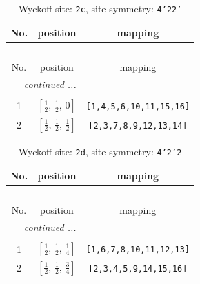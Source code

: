 \documentclass[fleqn,8pt]{jsarticle}
\begin{document}
\renewcommand{\arraystretch}{1.2}
\begin{longtable}{ccc}
\caption{Wyckoff site: {\tt 2c}, site symmetry: {\tt 4'22'}}
 \\
 \hline \hline
No. & position & mapping \\ \hline \endfirsthead

\multicolumn{2}{l}{\tablename\ \thetable{}} \\
 \hline \hline
No. & position & mapping \\ \hline \endhead

 \hline \hline
\multicolumn{2}{r}{\footnotesize\it continued ...} \\ \endfoot

 \hline \hline
\multicolumn{2}{r}{} \\ \endlastfoot

1 & $\left[ \frac{1}{2},\, \frac{1}{2},\, 0 \right]$ & {\tt [1,4,5,6,10,11,15,16]} \\ \hline
2 & $\left[ \frac{1}{2},\, \frac{1}{2},\, \frac{1}{2} \right]$ & {\tt [2,3,7,8,9,12,13,14]} \\
\end{longtable}
\renewcommand{\arraystretch}{1.2}
\begin{longtable}{ccc}
\caption{Wyckoff site: {\tt 2d}, site symmetry: {\tt 4'2'2}}
 \\
 \hline \hline
No. & position & mapping \\ \hline \endfirsthead

\multicolumn{2}{l}{\tablename\ \thetable{}} \\
 \hline \hline
No. & position & mapping \\ \hline \endhead

 \hline \hline
\multicolumn{2}{r}{\footnotesize\it continued ...} \\ \endfoot

 \hline \hline
\multicolumn{2}{r}{} \\ \endlastfoot

1 & $\left[ \frac{1}{2},\, \frac{1}{2},\, \frac{1}{4} \right]$ & {\tt [1,6,7,8,10,11,12,13]} \\ \hline
2 & $\left[ \frac{1}{2},\, \frac{1}{2},\, \frac{3}{4} \right]$ & {\tt [2,3,4,5,9,14,15,16]} \\
\end{longtable}
\renewcommand{\arraystretch}{1.2}
\end{document}
